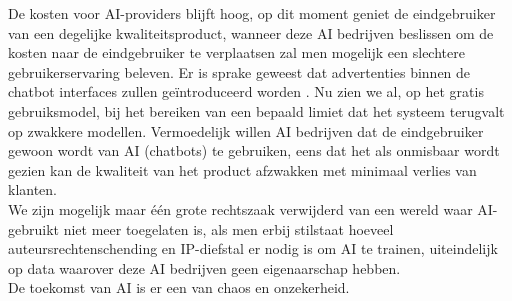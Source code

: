 De kosten voor AI-providers blijft hoog, op dit moment geniet de eindgebruiker van een degelijke kwaliteitsproduct, wanneer deze AI bedrijven beslissen om de kosten naar de eindgebruiker te verplaatsen zal men mogelijk een slechtere gebruikerservaring beleven. Er is sprake geweest dat advertenties binnen de chatbot interfaces zullen geïntroduceerd worden \autocite{OpenAI2026}. Nu zien we al, op het gratis gebruiksmodel, bij het bereiken van een bepaald limiet dat het systeem terugvalt op zwakkere modellen. Vermoedelijk willen AI bedrijven dat de eindgebruiker gewoon wordt van AI (chatbots) te gebruiken, eens dat het als onmisbaar wordt gezien kan de kwaliteit van het product afzwakken met minimaal verlies van klanten. \\

We zijn mogelijk maar één grote rechtszaak verwijderd van een wereld waar AI-gebruikt niet meer toegelaten is, als men erbij stilstaat hoeveel auteursrechtenschending en IP-diefstal er nodig is om AI te trainen, uiteindelijk op data waarover deze AI bedrijven geen eigenaarschap hebben. \\

De toekomst van AI is er een van chaos en onzekerheid.

